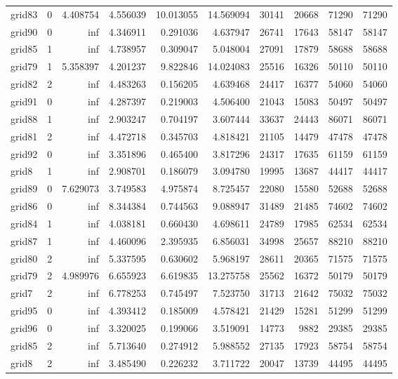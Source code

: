 \begin{longtable}{|l|r|r|r|r|r|r|r|r|r|}
grid83 & 0 & 4.408754 & 4.556039 & 10.013055 & 14.569094 & 30141 & 20668 & 71290 & 71290 \\
grid90 & 0 & inf & 4.346911 & 0.291036 & 4.637947 & 26741 & 17643 & 58147 & 58147 \\
grid85 & 1 & inf & 4.738957 & 0.309047 & 5.048004 & 27091 & 17879 & 58688 & 58688 \\
grid79 & 1 & 5.358397 & 4.201237 & 9.822846 & 14.024083 & 25516 & 16326 & 50110 & 50110 \\
grid82 & 2 & inf & 4.483263 & 0.156205 & 4.639468 & 24417 & 16377 & 54060 & 54060 \\
grid91 & 0 & inf & 4.287397 & 0.219003 & 4.506400 & 21043 & 15083 & 50497 & 50497 \\
grid88 & 1 & inf & 2.903247 & 0.704197 & 3.607444 & 33637 & 24443 & 86071 & 86071 \\
grid81 & 2 & inf & 4.472718 & 0.345703 & 4.818421 & 21105 & 14479 & 47478 & 47478 \\
grid92 & 0 & inf & 3.351896 & 0.465400 & 3.817296 & 24317 & 17635 & 61159 & 61159 \\
grid8 & 1 & inf & 2.908701 & 0.186079 & 3.094780 & 19995 & 13687 & 44417 & 44417 \\
grid89 & 0 & 7.629073 & 3.749583 & 4.975874 & 8.725457 & 22080 & 15580 & 52688 & 52688 \\
grid86 & 0 & inf & 8.344384 & 0.744563 & 9.088947 & 31489 & 21485 & 74602 & 74602 \\
grid84 & 1 & inf & 4.038181 & 0.660430 & 4.698611 & 24789 & 17985 & 62534 & 62534 \\
grid87 & 1 & inf & 4.460096 & 2.395935 & 6.856031 & 34998 & 25657 & 88210 & 88210 \\
grid80 & 2 & inf & 5.337595 & 0.630602 & 5.968197 & 28611 & 20365 & 71575 & 71575 \\
grid79 & 2 & 4.989976 & 6.655923 & 6.619835 & 13.275758 & 25562 & 16372 & 50179 & 50179 \\
grid7 & 2 & inf & 6.778253 & 0.745497 & 7.523750 & 31713 & 21642 & 75032 & 75032 \\
grid95 & 0 & inf & 4.393412 & 0.185009 & 4.578421 & 21429 & 15281 & 51299 & 51299 \\
grid96 & 0 & inf & 3.320025 & 0.199066 & 3.519091 & 14773 & 9882 & 29385 & 29385 \\
grid85 & 2 & inf & 5.713640 & 0.274912 & 5.988552 & 27135 & 17923 & 58754 & 58754 \\
grid8 & 2 & inf & 3.485490 & 0.226232 & 3.711722 & 20047 & 13739 & 44495 & 44495 \\

\end{longtable}

